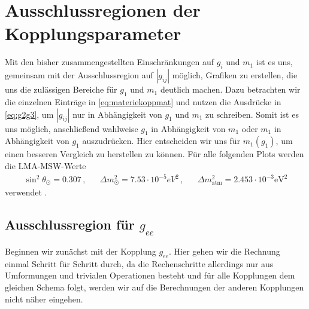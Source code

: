 \chapter{Ausschlussregionen der Kopplungsparameter}


Mit den bisher zusammengestellten Einschränkungen auf $g_i$ und $m_1$ ist es uns, gemeinsam mit der Ausschlussregion auf $|g_{i j}|$ möglich, Grafiken zu erstellen, die uns die zulässigen Bereiche für $g_1$ und $m_1$ deutlich machen.
Dazu betrachten wir die einzelnen Einträge in \eqref{eq:materiekoppmat} und nutzen die Ausdrücke in \eqref{eq:g2g3}, um $|g_{i j}|$ nur in Abhängigkeit von $g_1$ und $m_1$ zu schreiben.
Somit ist es uns möglich, anschließend wahlweise $g_1$ in Abhängigkeit von $m_1$ oder $m_1$ in Abhängigkeit von $g_1$ auszudrücken.
Hier entscheiden wir uns für $m_1 (g_1)$, um einen besseren Vergleich zu \cite{päspaper} herstellen zu können.
Für alle folgenden Plots werden die LMA-MSW-Werte
\begin{align*}
    \sin^2\theta_\odot = \num{0.307}\,, && \Delta m^2_\odot = \num{7.53} \cdot 10^{-5} \si{eV}^2\,, && \Delta m^2_\text{atm} = \num{2.453} \cdot 10^{-3} \si{\eV}^2
\end{align*}
verwendet \cite{neutrinospdg}.

\section{Ausschlussregion für $g_{ee}$}

Beginnen wir zunächst mit der Kopplung $g_{ee}$.
Hier gehen wir die Rechnung einmal Schritt für Schritt durch, da die Rechenschritte allerdings nur aus Umformungen und trivialen Operationen besteht und für alle Kopplungen dem gleichen Schema folgt, werden wir auf die Berechnungen der anderen
Kopplungen nicht näher eingehen.

